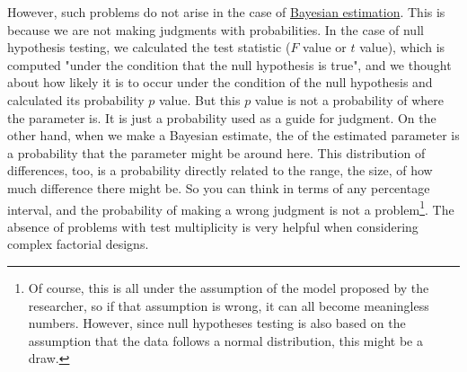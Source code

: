 \documentclass{ltjsbook}
\begin{document}
However, such problems do not arise in the case of \underline{Bayesian estimation}. This is because we are not making judgments with probabilities. In the case of null hypothesis testing, we calculated the test statistic ($F$ value or $t$ value), which is computed "under the condition that the null hypothesis is true", and we thought about how likely it is to occur under the condition of the null hypothesis and calculated its probability $p$ value. But this $p$ value is not a probability of where the parameter is. It is just a probability used as a guide for judgment. On the other hand, when we make a Bayesian estimate, the  of the estimated parameter is a probability that the parameter might be around here. This distribution of differences, too, is a probability directly related to the range, the size, of how much difference there might be. So you can think in terms of any percentage interval, and the probability of making a wrong judgment is not a problem\footnote{Of course, this is all under the assumption of the model proposed by the researcher, so if that assumption is wrong, it can all become meaningless numbers. However, since null hypotheses testing is also based on the assumption that the data follows a normal distribution, this might be a draw.}. The absence of problems with test multiplicity is very helpful when considering complex factorial designs.

\end{document}

